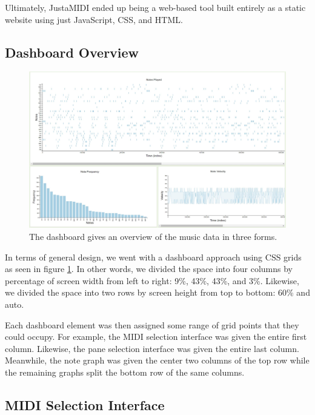 \documentclass[journal]{vgtc}                %
\begin{document}
Ultimately, JustaMIDI ended up being a web-based tool built entirely as a
static website using just JavaScript, CSS, and HTML.

\subsection{Dashboard Overview}

\begin{figure}[h]
  \centering
  \includegraphics[width=\columnwidth]{dashboard-single-track}
  \caption{The dashboard gives an overview of the music data in three forms.}
  \label{fig:dashboard}
\end{figure}

In terms of general design, we went with a dashboard approach using CSS grids
as seen in figure \ref{fig:dashboard}. In other words, we divided the space into
four columns by percentage of screen width from left to right: 9\%, 43\%, 43\%,
and 3\%. Likewise, we divided the space into two rows by screen height from top
to bottom: 60\% and auto.

Each dashboard element was then assigned some range of grid points that they
could occupy. For example, the MIDI selection interface was given the entire
first column. Likewise, the pane selection interface was given the entire
last column. Meanwhile, the note graph was given the center two columns of
the top row while the remaining graphs split the bottom row of the same
columns.

\subsection{MIDI Selection Interface}
\end{document}
